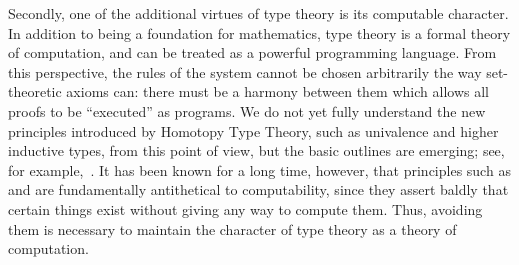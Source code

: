 Secondly, one of the additional virtues of type theory is its computable character.
In addition to being a foundation for mathematics, type theory is a formal theory of computation, and can be treated as a powerful programming language.
%
From this perspective, the rules of the system cannot be chosen arbitrarily the way set-theoretic axioms can: there must be a harmony between them which allows all proofs to be ``executed'' as programs.
We do not yet fully understand the new principles introduced by Homotopy Type Theory, such as univalence and higher inductive types, from
this point of view, but the basic outlines are emerging; see, for example,~\cite{lh:canonicity}.
It has been known for a long time, however, that principles such as \choice{} and \LEM{} are fundamentally antithetical to computability,
since they assert baldly that certain things exist without giving any way to compute them.
Thus, avoiding them is necessary to maintain the character of type theory as a theory of computation.

